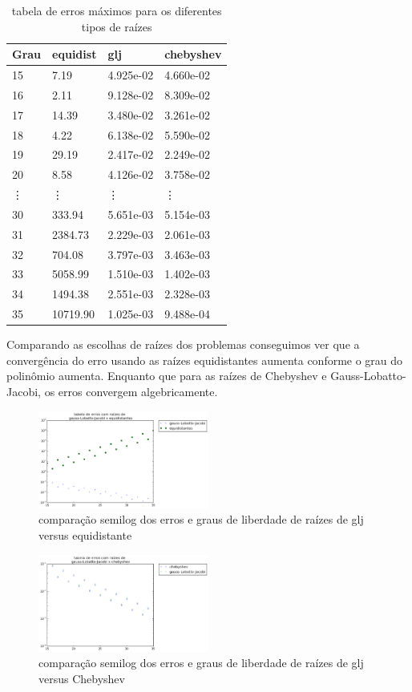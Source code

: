 \pagebreak
\begin{table}[h]
\centering
\caption{tabela de erros máximos para os diferentes tipos de raízes}
\label{my-label}
\begin{tabular}{|l|l|l|l|}
\hline
Grau & equidist & glj       & chebyshev     \\ \hline
15   & 7.19     & 4.925e-02 & 4.660e-02 \\
16   & 2.11     & 9.128e-02 & 8.309e-02 \\
17   & 14.39    & 3.480e-02 & 3.261e-02 \\
18   & 4.22     & 6.138e-02 & 5.590e-02 \\
19   & 29.19    & 2.417e-02 & 2.249e-02 \\
20   & 8.58     & 4.126e-02 & 3.758e-02 \\
\vdots   & \vdots              & \vdots    & \vdots    \\
30   & 333.94   & 5.651e-03 & 5.154e-03 \\
31   & 2384.73  & 2.229e-03 & 2.061e-03 \\
32   & 704.08   & 3.797e-03 & 3.463e-03 \\
33   & 5058.99  & 1.510e-03 & 1.402e-03 \\
34   & 1494.38  & 2.551e-03 & 2.328e-03 \\
35   & 10719.90 & 1.025e-03 & 9.488e-04 \\ \hline
\end{tabular}
\end{table}
Comparando as escolhas de raízes dos problemas conseguimos ver que a convergência do erro usando as raízes equidistantes aumenta conforme o grau do polinômio aumenta. Enquanto que para as raízes de Chebyshev e Gauss-Lobatto-Jacobi, os erros convergem algebricamente.
\begin{figure}[!ht]
  \includegraphics[width=0.5\textwidth,center]{figuras/glj_equi.png}
  \caption{comparação semilog  dos erros e graus de liberdade de raízes de glj versus equidistante }
\end{figure}
\begin{figure}[!hb]
  \includegraphics[width=0.5\textwidth,center]{figuras/glj_cheb.png}
  \caption{comparação semilog  dos erros e graus de liberdade de raízes de glj versus Chebyshev}
\end{figure}
